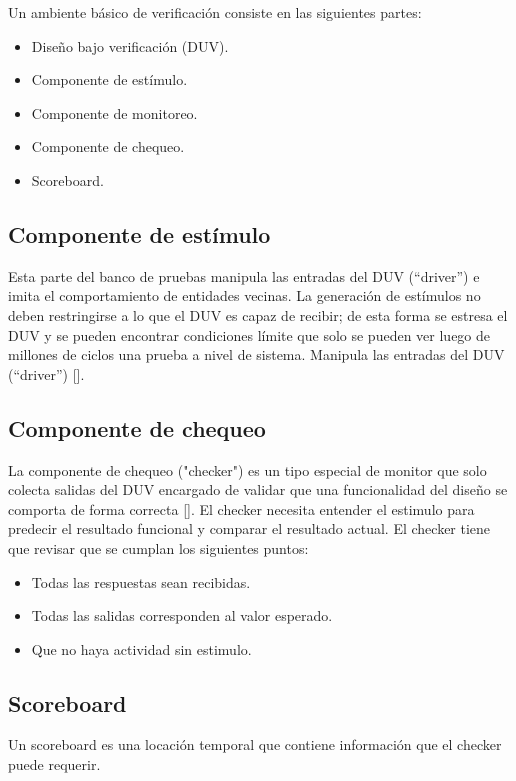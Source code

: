 Un ambiente básico de verificación consiste en las siguientes partes:

\begin{itemize}
\item Diseño bajo verificación (DUV).
\item Componente de estímulo.
\item Componente de monitoreo.
\item Componente de chequeo.
\item Scoreboard.
\end{itemize}

\subsection{Componente de estímulo}

Esta parte del banco de pruebas manipula las entradas del DUV (“driver”) e imita el comportamiento de entidades vecinas.
La generación de estímulos no deben restringirse
a lo que el DUV es capaz de recibir; de esta forma se estresa el DUV y se pueden encontrar condiciones límite que solo se pueden ver luego de millones de ciclos una prueba a nivel de sistema. Manipula las entradas del DUV (“driver”) [\cite{Wile}].

\subsection{Componente de chequeo}

La componente  de chequeo ("checker") es un tipo especial de monitor que solo colecta salidas del DUV encargado de validar que una funcionalidad del diseño se comporta de forma correcta [\cite{Wile}].
El checker necesita entender el estimulo para predecir el resultado funcional y comparar el resultado actual.
El checker tiene que revisar que se cumplan los siguientes puntos:
\begin{itemize}
\item Todas las respuestas sean recibidas.
\item Todas las salidas corresponden al valor esperado.
\item Que no haya actividad sin estimulo.
\end{itemize}

\subsection{Scoreboard}

Un scoreboard es una locación temporal que contiene información que el checker puede requerir.


